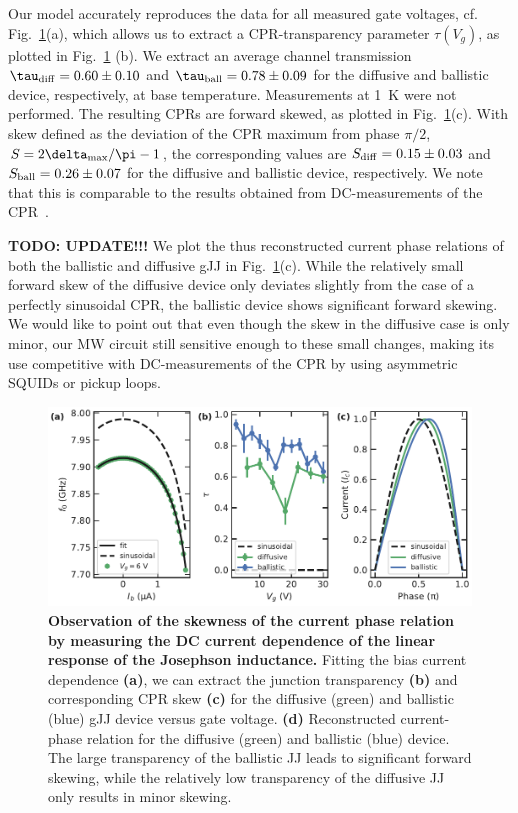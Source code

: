 Our model accurately reproduces the data for all measured gate voltages, cf. Fig.~\ref{fig:figure4}(a), which allows us to extract a CPR-transparency parameter $\tau(V_g)$, as plotted in Fig.~\ref{fig:figure4}
(b).
%
We extract an average channel transmission $\tau_{\rm diff}=0.60\pm0.10$ and $\tau_{\rm ball}=0.78\pm0.09$ for the diffusive and ballistic device, respectively, at base temperature.
%
Measurements at \SI{1}{\kelvin} were not performed.
%
The resulting CPRs are forward skewed, as plotted in Fig.~\ref{fig:figure4}(c).
%
With skew defined as the deviation of the CPR maximum from phase $\pi/2$, $S=2\delta_{\rm max}/\pi -1$, the corresponding values are $S_{\rm diff}=0.15\pm0.03$ and $S_{\rm ball}=0.26\pm0.07$ for the diffusive and ballistic device, respectively.
%
We note that this is comparable to the results obtained from DC-measurements of the CPR~\cite{englishObservationNonsinusoidalCurrentphase2016,nandaCurrentPhaseRelationBallistic2017}.

\textbf{TODO: UPDATE!!!}
We plot the thus reconstructed current phase relations of both the ballistic and diffusive gJJ in Fig.~\ref{fig:figure4}(c).
%
While the relatively small forward skew of the diffusive device only deviates slightly from the case of a perfectly sinusoidal CPR, the ballistic device shows significant forward skewing.
%
We would like to point out that even though the skew in the diffusive case is only minor, our MW circuit still sensitive enough to these small changes, making its use competitive with DC-measurements of the CPR by using asymmetric SQUIDs or pickup loops.

\begin{figure}[t]
	\centering
	\includegraphics[width=\linewidth]{chapter-gJJ-CPR/figs/Figure4}
	\caption{
		\textbf{Observation of the skewness of the current phase relation by measuring the DC current dependence of the linear response of the Josephson inductance.}
		Fitting the bias current dependence \textbf{(a)}, we can extract the junction transparency \textbf{(b)} and corresponding CPR skew \textbf{(c)} for the diffusive (green) and ballistic (blue) gJJ device versus gate voltage.
		\textbf{(d)} Reconstructed current-phase relation for the diffusive (green) and ballistic (blue) device.
		The large transparency of the ballistic JJ leads to significant forward skewing, while the relatively low transparency of the diffusive JJ only results in minor skewing.
	}
	\label{fig:figure4}
\end{figure}

